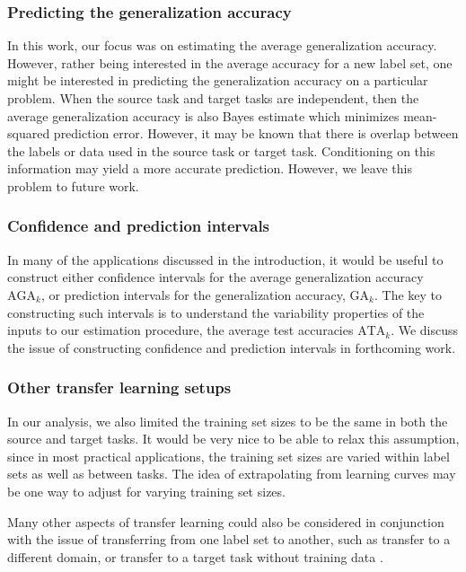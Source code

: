\documentclass[twoside,11pt]{article}
\begin{document}
\subsubsection*{Predicting the generalization accuracy}
In this work, our focus was on estimating the average generalization accuracy.  However, rather being interested in the average accuracy for a new label set, one might be interested in predicting the generalization accuracy on a particular problem.  When the source task and target tasks are independent, then the average generalization accuracy is also Bayes estimate which minimizes mean-squared prediction error.  However, it may be known that there is overlap between the labels or data used in the source task or target task.  Conditioning on this information may yield a more accurate prediction.  However, we leave this problem to future work.

\subsubsection*{Confidence and prediction intervals}
In many of the applications discussed in the introduction, it would be useful to construct either confidence intervals for the average generalization accuracy $\text{AGA}_k$, or prediction intervals for the generalization accuracy, $\text{GA}_k$.
The key to constructing such intervals is to understand the variability properties of the inputs to our estimation procedure, the average test accuracies $\text{ATA}_k$.  We discuss the issue of constructing confidence and prediction intervals in forthcoming work.

\subsubsection*{Other transfer learning setups}
In our analysis, we also limited the training set sizes to be the same in both the source and target tasks.  It would be very nice to be able to relax this assumption, since in most practical applications, the training set sizes are varied within label sets as well as between tasks.  The idea of extrapolating from learning curves \citep{cortes1994learning} may be one way to adjust for varying training set sizes.  


Many other aspects of transfer learning could also be considered in
conjunction with the issue of transferring from one label set to
another, such as transfer to a different domain, or transfer to a
target task without training data \citep{pan2010survey}. 
\end{document}
